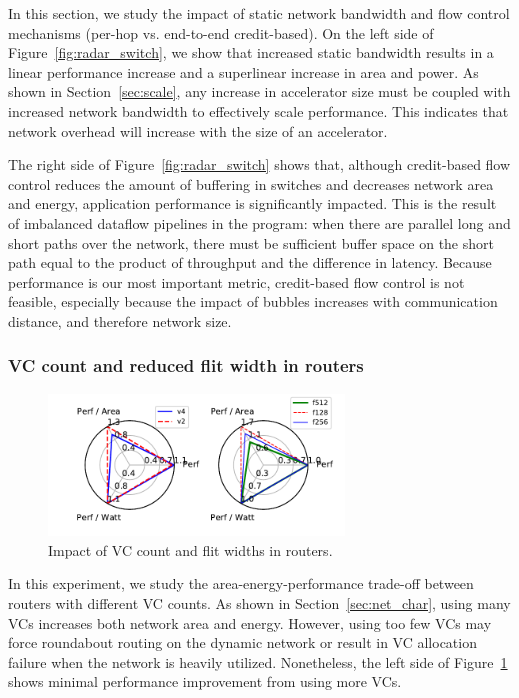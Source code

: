 In this section, we study the impact of static network bandwidth and flow control mechanisms (per-hop vs. end-to-end credit-based). 
On the left side of Figure~\ref{fig:radar_switch}, we show that increased static bandwidth results in a linear performance increase and a superlinear increase in area and power. 
As shown in Section~\ref{sec:scale}, any increase in accelerator size must be coupled with increased network bandwidth to effectively scale performance. 
This indicates that network overhead will increase with the size of an accelerator.

The right side of Figure~\ref{fig:radar_switch} shows that, although credit-based flow control reduces the amount of buffering in switches and decreases network area and energy, application performance is significantly impacted. 
This is the result of imbalanced dataflow pipelines in the program: when there are parallel long and short paths over the network, there must be sufficient buffer space on the short path equal to the product of throughput and the difference in latency. 
Because performance is our most important metric, credit-based flow control is not feasible, especially because the impact of bubbles increases with communication distance, and therefore network size.

\subsubsection{VC count and reduced flit width in routers}
\begin{figure}
  \centering
\includegraphics[width=0.7\textwidth]{network/figs/radar_router.pdf}
  \caption{Impact of VC count and flit widths in routers.}\label{fig:radar_router}
\end{figure}
In this experiment, we study the area-energy-performance trade-off between routers with different VC counts. As shown
in Section~\ref{sec:net_char}, using many VCs increases both network area and energy.
However, using too few VCs may force roundabout routing on the dynamic network or result in VC allocation failure when the network is heavily utilized.
Nonetheless, the left side of Figure~\ref{fig:radar_router} shows minimal performance improvement from using more VCs. 

